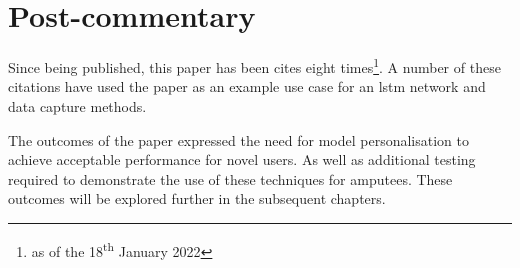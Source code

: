 
\section{Post-commentary}
Since being published, this paper has been cites eight times\footnote{as of the 18\textsuperscript{th} January 2022}. A number of these citations have used the paper as an example use case for an \acrshort{lstm} network\cite{Uddin2021, Du2021, Velezguerrero2021, Low2022} and data capture methods\cite{Shin2021, Su2021}.

The outcomes of the paper expressed the need for model personalisation to achieve acceptable performance for novel users. As well as additional testing required to demonstrate the use of these techniques for amputees. These outcomes will be explored further in the subsequent chapters.
